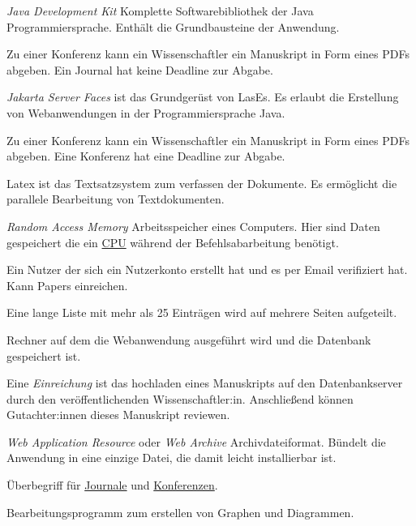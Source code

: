 \begin{description}
	 \emph{Java Development Kit} Komplette Softwarebibliothek der Java Programmiersprache. Enthält die Grundbausteine der Anwendung.

	 Zu einer Konferenz kann ein Wissenschaftler ein Manuskript in Form eines PDFs abgeben. Ein Journal hat keine Deadline zur Abgabe.

	 \emph{Jakarta Server Faces} ist das Grundgerüst von LasEs. Es erlaubt die Erstellung von Webanwendungen in der Programmiersprache Java.

	 Zu einer Konferenz kann ein Wissenschaftler ein Manuskript in Form eines PDFs abgeben. Eine Konferenz hat eine Deadline zur Abgabe.

	 Latex ist das Textsatzsystem zum verfassen der Dokumente. Es ermöglicht die parallele Bearbeitung von Textdokumenten.

	 \emph{Random Access Memory} Arbeitsspeicher eines Computers. Hier sind Daten gespeichert die ein \hyperref[glo:cpu]{CPU} während der Befehlsabarbeitung benötigt.

	 Ein Nutzer der sich ein Nutzerkonto erstellt hat und es per Email verifiziert hat. Kann Papers einreichen.

	 Eine lange Liste mit mehr als 25 Einträgen wird auf mehrere Seiten aufgeteilt.

	 Rechner auf dem die Webanwendung ausgeführt wird und die Datenbank gespeichert ist.

	 Eine \emph{Einreichung} ist das hochladen eines Manuskripts auf den Datenbankserver durch den veröffentlichenden Wissenschaftler:in. Anschließend können Gutachter:innen dieses Manuskript reviewen.

	 \emph{Web Application Resource} oder \emph{Web Archive} Archivdateiformat. Bündelt die Anwendung in eine einzige Datei, die damit leicht installierbar ist.

	 Überbegriff für \hyperref[glo:journal]{Journale} und \hyperref[glo:konf]{Konferenzen}.

	 Bearbeitungsprogramm zum erstellen von Graphen und Diagrammen.
\end{description}
